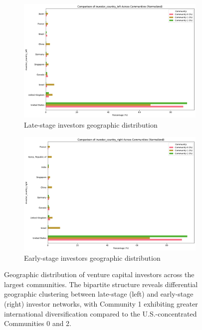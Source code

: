 
\begin{figure}[htbp]
\centering
\begin{subfigure}{0.48\textwidth}
    \centering
    \includegraphics[width=1\textwidth]{./assets/investor-left-countries.png}
    \caption{Late-stage investors geographic distribution}
    \label{fig:late_stage_geo}
\end{subfigure}
\hfill
\begin{subfigure}{0.48\textwidth}
    \centering
    \includegraphics[width=1\textwidth]{./assets/investor-right-countries.png}
    \caption{Early-stage investors geographic distribution}
    \label{fig:early_stage_geo}
\end{subfigure}
\caption{Geographic distribution of venture capital investors across the largest communities. The bipartite structure reveals differential geographic clustering between late-stage (left) and early-stage (right) investor networks, with Community 1 exhibiting greater international diversification compared to the U.S.-concentrated Communities 0 and 2.}
\label{fig:geographic_distribution}
\end{figure}

